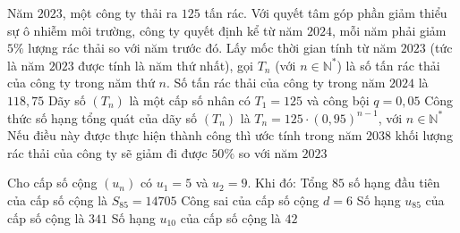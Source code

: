 \begin{ex}%
	Năm $2023$, một công ty thải ra $125$ tấn rác. Với quyết tâm góp phần giảm thiểu sự ô nhiễm môi trường, công ty quyết định kể từ năm $2024$, mỗi năm phải giảm $5\%$ lượng rác thải so với năm trước đó. Lấy mốc thời gian tính từ năm $2023$ (tức là năm $2023$ được tính là năm thứ nhất), gọi $T_n$ (với $n\in \mathbb{N}^*$) là số tấn rác thải của công ty trong năm thứ $n$.
	\choiceTF
	{\True Số tấn rác thải của công ty trong năm $2024$ là $118{,}75$}
	{Dãy số $(T_n)$ là một cấp số nhân có $T_1=125$ và công bội $q=0{,}05$}
	{\True Công thức số hạng tổng quát của dãy số $(T_n)$ là $T_n=125\cdot(0{,}95)^{n-1}$, với $n\in \mathbb{N}^*$}
	{Nếu điều này được thực hiện thành công thì ước tính trong năm $2038$ khối lượng rác thải của công ty sẽ giảm đi được $50\%$ so với năm $2023$}
\end{ex}

\begin{ex}%
    Cho cấp số cộng $(u_n)$ có $u_1=5$ và $u_2=9$. Khi đó:
    \choiceTF
        {\True Tổng $85$ số hạng đầu tiên của cấp số cộng là $S_{85}=14705$}
        {Công sai của cấp số cộng $d=6$}
        {\True Số hạng $u_{85}$ của cấp số cộng là $341$}
        {Số hạng $u_{10}$ của cấp số cộng là $42$}
\end{ex}

